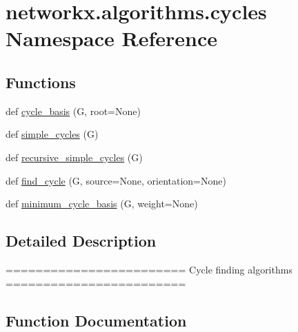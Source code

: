 \hypertarget{namespacenetworkx_1_1algorithms_1_1cycles}{}\section{networkx.\+algorithms.\+cycles Namespace Reference}
\label{namespacenetworkx_1_1algorithms_1_1cycles}
\subsection*{Functions}
\begin{DoxyCompactItemize}
\item 
def \hyperlink{namespacenetworkx_1_1algorithms_1_1cycles_a5bfa96f32eeb2c330eabaccac3fcbf47}{cycle\+\_\+basis} (G, root=None)
\item 
def \hyperlink{namespacenetworkx_1_1algorithms_1_1cycles_a24027fc741f4f11cef8f92482a159943}{simple\+\_\+cycles} (G)
\item 
def \hyperlink{namespacenetworkx_1_1algorithms_1_1cycles_ae7bedb7146b5c717fd6489a63bdfefe3}{recursive\+\_\+simple\+\_\+cycles} (G)
\item 
def \hyperlink{namespacenetworkx_1_1algorithms_1_1cycles_ab86186b756148879600221a62b7f006b}{find\+\_\+cycle} (G, source=None, orientation=None)
\item 
def \hyperlink{namespacenetworkx_1_1algorithms_1_1cycles_a481131a004cc5e80148f5a9650871650}{minimum\+\_\+cycle\+\_\+basis} (G, weight=None)
\end{DoxyCompactItemize}


\subsection{Detailed Description}
\begin{DoxyVerb}========================
Cycle finding algorithms
========================
\end{DoxyVerb}
 

\subsection{Function Documentation}
\mbox{\label{namespacenetworkx_1_1algorithms_1_1cycles_a5bfa96f32eeb2c330eabaccac3fcbf47}} 
